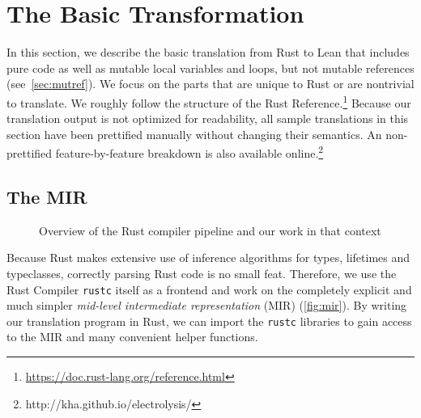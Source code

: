\section{The Basic Transformation}
\label{sec:trans}

In this section, we describe the basic translation from Rust to Lean that
includes pure code as well as mutable local variables and loops, but not mutable
references (see~\autoref{sec:mutref}). We focus on the parts that are unique to
Rust or are nontrivial to translate. We roughly follow the structure of the
Rust Reference.\footnote{\url{https://doc.rust-lang.org/reference.html}} Because
our translation output is not optimized for readability, all sample translations
in this section have been prettified manually without changing their semantics.
An non-prettified feature-by-feature breakdown is also available
online.\footnote{http://kha.github.io/electrolysis/}

\subsection{The MIR}
\label{sec:mir}

\begin{figure}[!bp]
  \centering
  \caption{Overview of the Rust compiler pipeline and our work in that context}
  \label{fig:mir}
\end{figure}

Because Rust makes extensive use of inference algorithms for types, lifetimes and typeclasses,
correctly parsing Rust code is no small feat. Therefore, we use the Rust
Compiler \texttt{rustc} itself as a frontend and work on the completely explicit and
much simpler \emph{mid-level intermediate representation} (MIR)
(\autoref{fig:mir}). By writing our translation program in Rust, we can import
the \texttt{rustc} libraries to gain access to the MIR and many convenient
helper functions.

